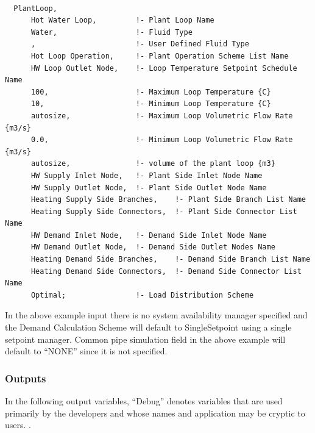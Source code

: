 \begin{lstlisting}

  PlantLoop,
      Hot Water Loop,         !- Plant Loop Name
      Water,                  !- Fluid Type
      ,                       !- User Defined Fluid Type
      Hot Loop Operation,     !- Plant Operation Scheme List Name
      HW Loop Outlet Node,    !- Loop Temperature Setpoint Schedule Name
      100,                    !- Maximum Loop Temperature {C}
      10,                     !- Minimum Loop Temperature {C}
      autosize,               !- Maximum Loop Volumetric Flow Rate {m3/s}
      0.0,                    !- Minimum Loop Volumetric Flow Rate {m3/s}
      autosize,               !- volume of the plant loop {m3}
      HW Supply Inlet Node,   !- Plant Side Inlet Node Name
      HW Supply Outlet Node,  !- Plant Side Outlet Node Name
      Heating Supply Side Branches,    !- Plant Side Branch List Name
      Heating Supply Side Connectors,  !- Plant Side Connector List Name
      HW Demand Inlet Node,   !- Demand Side Inlet Node Name
      HW Demand Outlet Node,  !- Demand Side Outlet Nodes Name
      Heating Demand Side Branches,    !- Demand Side Branch List Name
      Heating Demand Side Connectors,  !- Demand Side Connector List Name
      Optimal;                !- Load Distribution Scheme
\end{lstlisting}

In the above example input there is no system availability manager specified and the Demand Calculation Scheme will default to SingleSetpoint using a single setpoint manager. Common pipe simulation field in the above example will default to ``NONE'' since it is not specified.

\subsubsection{Outputs}\label{outputs-024}

In the following output variables, ``Debug'' denotes variables that are used primarily by the developers and whose names and application may be cryptic to users. .

